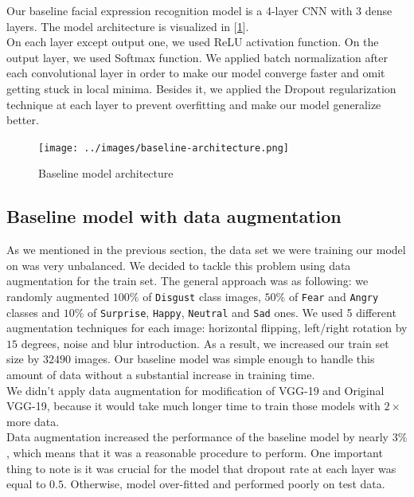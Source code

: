 Our baseline facial expression recognition model is a 4-layer CNN with 3 dense layers. The model architecture is visualized in [\ref{fig:baseline}].\\

On each layer except output one, we used ReLU activation function. On the output layer, we used Softmax function. We applied batch normalization after each convolutional layer in order to make our model converge faster and omit getting stuck in local minima. Besides it, we applied the Dropout regularization technique at each layer to prevent overfitting and make our model generalize better. \\

\begin{figure}
	\centering
	\texttt{[image: ../images/baseline-architecture.png]}
	\caption{Baseline model architecture}
	\label{fig:baseline}
\end{figure}

\subsection{Baseline model with data augmentation}

As we mentioned in the previous section, the data set we were training our model on was very unbalanced. We decided to tackle this problem using data augmentation for the train set. The general approach was as following: we randomly augmented $100\%$ of \texttt{Disgust} class images, $50\%$ of \texttt{Fear} and \texttt{Angry} classes and $10\%$ of \texttt{Surprise}, \texttt{Happy}, \texttt{Neutral} and \texttt{Sad} ones. We used 5 different augmentation techniques for each image: horizontal flipping, left/right rotation by $15$ degrees, noise and blur introduction. As a result, we increased our train set size by $32490$ images. Our baseline model was simple enough to handle this amount of data without a substantial increase in training time.\\

We didn't apply data augmentation for modification of VGG-19 and Original VGG-19, because it would take much longer time to train those models with $2\times$ more data.\\ 

Data augmentation increased the performance of the baseline model by nearly $3\%$, which means that it was a reasonable procedure to perform. One important thing to note is it was crucial for the model that dropout rate at each layer was equal to $0.5$. Otherwise, model over-fitted and performed poorly on test data.\\

